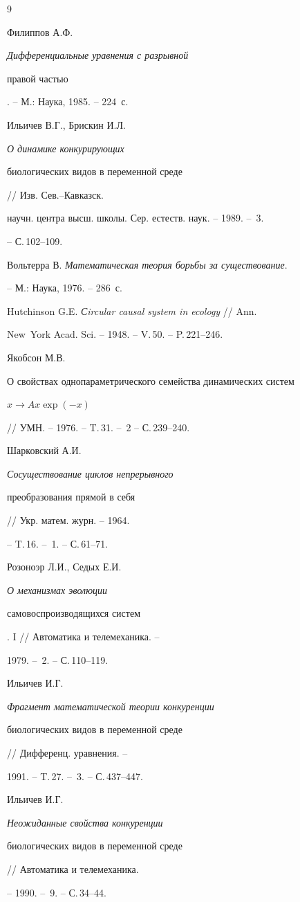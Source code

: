\begin{thebibliography}{9}




Филиппов А.Ф. {\em Дифференциальные уравнения с разрывной 


правой частью}. -- М.: Наука, 1985. -- 224~с.




Ильичев В.Г., Брискин И.Л. {\em О динамике конкурирующих 


биологических видов в переменной среде} // Изв. Сев.--Кавказск. 


научн. центра высш. школы. Сер. естеств. наук. -- 1989. -- \No\,3. 


-- С.\,102--109.




Вольтерра В. {\em Математическая теория борьбы за существование}. 


-- М.: Наука, 1976. -- 286~с.




Hutchinson G.E. {\em Сircular causal system in ecology} // Ann. 


New~York Acad. Sci. -- 1948. -- V.\,50. -- P.\,221--246.




Якобсон М.В. {\em


О свойствах однопараметрического семейства динамических систем


$x\to Ax\exp(-x)$} // УМН. -- 1976. -- T.\,31. -- \No\,2 -- С.\,239--240.




Шарковский А.И. {\em Сосуществование циклов непрерывного 


преобразования прямой в себя} // Укр. матем. журн. -- 1964.


-- T.\,16. -- \No\,1. -- С.\,61--71.




Розоноэр Л.И., Седых Е.И. {\em О механизмах эволюции 


самовоспроизводящихся систем}. I // Автоматика и телемеханика. -- 


1979. -- \No\,2. -- С.\,110--119.




Ильичев И.Г. {\em Фрагмент математической теории конкуренции 


биологических видов в переменной среде} // Дифференц. уравнения. -- 


1991. -- T.\,27. -- \No\,3. -- С.\,437--447.




Ильичев И.Г. {\em Неожиданные свойства конкуренции 


биологических видов в переменной среде} // Автоматика и телемеханика. 


-- 1990. -- \No\,9. -- С.\,34--44.





\end{thebibliography}





